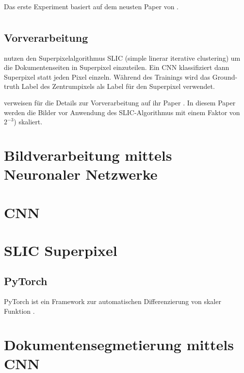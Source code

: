 Das erste Experiment basiert auf dem neusten Paper von \citeauthor{ChenConvolutionalNeuralNetworks2017}. 

\section{\textcite{ChenConvolutionalNeuralNetworks2017}}

\subsection{Vorverarbeitung}
\citeauthor{ChenConvolutionalNeuralNetworks2017} nutzen den Superpixelalgorithmus SLIC (simple linerar iterative clustering)
\cite{AchantaSLICSuperpixels2010} um die Dokumentenseiten in Superpixel einzuteilen.
Ein CNN klassifiziert dann Superpixel statt jeden Pixel einzeln.
Während des Trainings wird das Ground-truth Label des Zentrumpixels als Label für den Superpixel verwendet.

\citeauthor{ChenConvolutionalNeuralNetworks2017} verweisen für die Details zur Vorverarbeitung 
auf ihr Paper \cite{ChenPageSegmentationHistorical2016}. 
In diesem Paper werden die Bilder vor Anwendung des SLIC-Algorithmus mit einem Faktor von \(2^{-3}\)) skaliert.



\section{Bildverarbeitung mittels Neuronaler Netzwerke}
\section{CNN}
\section{SLIC Superpixel}
\cite{AchantaSLICSuperpixels2010}


\subsection{PyTorch}
PyTorch ist ein Framework zur automatischen Differenzierung von skaler Funktion \autocite{PaszkeAutomaticdifferentiationPyTorch2017}.

\section{Dokumentensegmetierung mittels CNN}




